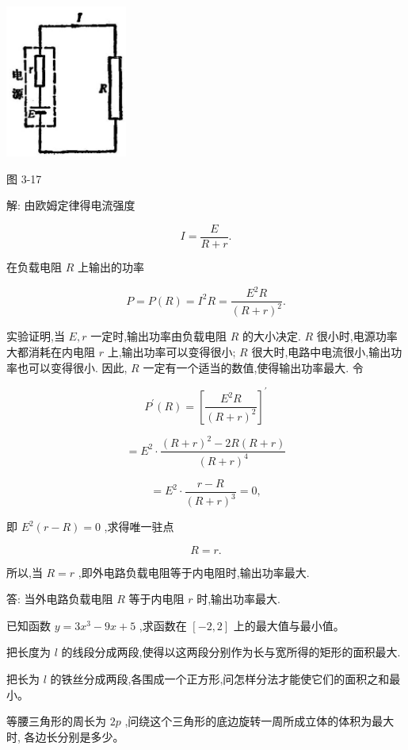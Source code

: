 \documentclass[lang=cn,newtx,10pt,scheme=chinese]{elegantbook}
\begin{document}
\begin{center}
\includegraphics[max width=0.3\textwidth]{images/01912c18-5c3f-733d-b775-749ba9897a9d_152_349261.jpg}
\end{center}

图 3-17

解: 由欧姆定律得电流强度

\[
I = \frac{E}{R + r}.
\]

在负载电阻 \(R\) 上输出的功率

\[
P = P\left( R\right) = {I}^{2}R = \frac{{E}^{2}R}{{\left( R + r\right) }^{2}}.
\]

实验证明,当 \(E,r\) 一定时,输出功率由负载电阻 \(R\) 的大小决定. \(R\) 很小时,电源功率大都消耗在内电阻 \(r\) 上,输出功率可以变得很小; \(R\) 很大时,电路中电流很小,输出功率也可以变得很小. 因此, \(R\) 一定有一个适当的数值,使得输出功率最大. 令

\[
{P}^{\prime }\left( R\right) = {\left\lbrack \frac{{E}^{2}R}{{\left( R + r\right) }^{2}}\right\rbrack }^{\prime }
\]

\[
= {E}^{2} \cdot \frac{{\left( R + r\right) }^{2} - {2R}\left( {R + r}\right) }{{\left( R + r\right) }^{4}}
\]

\[
= {E}^{2} \cdot \frac{r - R}{{\left( R + r\right) }^{3}} = 0,
\]

即 \({E}^{2}\left( {r - R}\right) = 0\) ,求得唯一驻点

\[
R = r\text{.}
\]

所以,当 \(R = r\) ,即外电路负载电阻等于内电阻时,输出功率最大.

答: 当外电路负载电阻 \(R\) 等于内电阻 \(r\) 时,输出功率最大.

\begin{problemset}[练习]

\item 已知函数 \(y = 3{x}^{3} - {9x} + 5\) ,求函数在 \(\left\lbrack {-2,2}\right\rbrack\) 上的最大值与最小值。

\item 把长度为 \(l\) 的线段分成两段,使得以这两段分别作为长与宽所得的矩形的面积最大.

\item 把长为 \(l\) 的铁丝分成两段,各围成一个正方形,问怎样分法才能使它们的面积之和最小。

\item 等腰三角形的周长为 \({2p}\) ,问绕这个三角形的底边旋转一周所成立体的体积为最大时, 各边长分别是多少。

\end{problemset}
\end{document}
